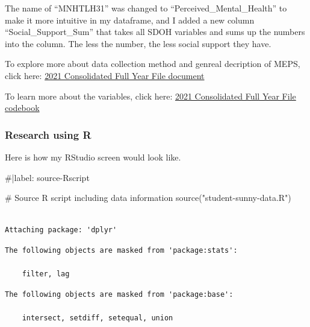\documentclass[
]{apa7}
\newenvironment{Shaded}{\begin{snugshade}}{\end{snugshade}}
\newcommand{\CommentTok}[1]{\textcolor[rgb]{0.37,0.37,0.37}{#1}}
\newcommand{\FunctionTok}[1]{\textcolor[rgb]{0.28,0.35,0.67}{#1}}
\newcommand{\NormalTok}[1]{\textcolor[rgb]{0.00,0.23,0.31}{#1}}
\newcommand{\StringTok}[1]{\textcolor[rgb]{0.13,0.47,0.30}{#1}}
\begin{document}
The name of ``MNHTLH31'' was changed to ``Perceived\_Mental\_Health'' to
make it more intuitive in my dataframe, and I added a new column
``Social\_Support\_Sum'' that takes all SDOH variables and sums up the
numbers into the column. The less the number, the less social support
they have.

To explore more about data collection method and genreal decription of
MEPS, click here: \href{data/h233doc.pdf}{2021 Consolidated Full Year
File document}

To learn more about the variables, click here:
\href{data/h233cb.pdf}{2021 Consolidated Full Year File codebook}

\subsubsection{Research using R}\label{research-using-r}

Here is how my RStudio screen would look like.

\begin{Shaded}
\begin{Highlighting}[]
\CommentTok{\#|label: source{-}Rscript}

\CommentTok{\# Source R script including data information}
\FunctionTok{source}\NormalTok{(}\StringTok{"student{-}sunny{-}data.R"}\NormalTok{)}
\end{Highlighting}
\end{Shaded}

\begin{verbatim}

Attaching package: 'dplyr'
\end{verbatim}

\begin{verbatim}
The following objects are masked from 'package:stats':

    filter, lag
\end{verbatim}

\begin{verbatim}
The following objects are masked from 'package:base':

    intersect, setdiff, setequal, union
\end{verbatim}
\end{document}

